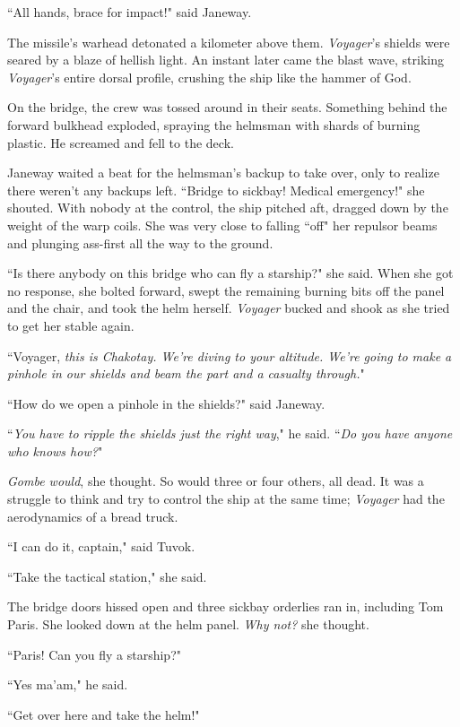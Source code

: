 \documentclass[twoside,letterpaper,12pt]{memoir}
\begin{document}
``All hands, brace for impact!" said Janeway.

The missile's warhead detonated a kilometer above them. \textit{Voyager}'s shields were seared by a blaze of hellish light. An instant later came the blast wave, striking \textit{Voyager}'s entire dorsal profile, crushing the ship like the hammer of God.

On the bridge, the crew was tossed around in their seats. Something behind the forward bulkhead exploded, spraying the helmsman with shards of burning plastic. He screamed and fell to the deck.

Janeway waited a beat for the helmsman's backup to take over, only to realize there weren't any backups left. ``Bridge to sickbay! Medical emergency!" she shouted. With nobody at the control, the ship pitched aft, dragged down by the weight of the warp coils. She was very close to falling ``off" her repulsor beams and plunging ass-first all the way to the ground.

``Is there anybody on this bridge who can fly a starship?" she said. When she got no response, she bolted forward, swept the remaining burning bits off the panel and the chair, and took the helm herself. \textit{Voyager} bucked and shook as she tried to get her stable again.

``Voyager, \textit{this is Chakotay. We're diving to your altitude. We're going to make a pinhole in our shields and beam the part and a casualty through.}"

``How do we open a pinhole in the shields?" said Janeway.

``\textit{You have to ripple the shields just the right way}," he said. ``\textit{Do you have anyone who knows how?}"

\textit{Gombe would}, she thought. So would three or four others, all dead. It was a struggle to think and try to control the ship at the same time; \textit{Voyager} had the aerodynamics of a bread truck.

``I can do it, captain," said Tuvok.

``Take the tactical station," she said.

The bridge doors hissed open and three sickbay orderlies ran in, including Tom Paris. She looked down at the helm panel. \textit{Why not?} she thought.

``Paris! Can you fly a starship?"

``Yes ma'am," he said.

``Get over here and take the helm!"
\end{document}
